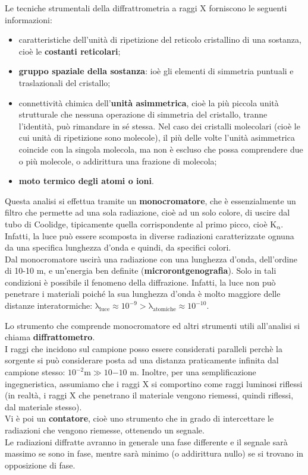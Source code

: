Le tecniche strumentali della diffrattrometria a raggi X forniscono le seguenti informazioni:
\begin{itemize}
    \item caratteristiche dell'unità di ripetizione del reticolo cristallino di una sostanza, cioè le \textbf{costanti reticolari};
    \item \textbf{gruppo spaziale della sostanza}: ioè gli elementi di simmetria puntuali e traslazionali del cristallo;
    \item connettività chimica dell'\textbf{unità asimmetrica}, cioè la più piccola unità strutturale che nessuna operazione di simmetria del cristallo, tranne l'identità, può rimandare in sé stessa. Nel caso dei cristalli molecolari (cioè le cui unità di ripetizione sono molecole), il più delle volte l'unità asimmetrica coincide con la singola molecola, ma non è escluso che possa comprendere due o più molecole, o addirittura una frazione di molecola;
    \item \textbf{moto termico degli atomi o ioni}.
\end{itemize}

Questa analisi si effettua tramite un \textbf{monocromatore}, che è essenzialmente un filtro che permette ad una sola radiazione, cioè ad un solo colore, di uscire dal tubo di Coolidge, tipicamente quella corrispondente al primo picco, cioè $\mathrm{K_{\alpha}}$. Infatti, la luce può essere scomposta in diverse radiazioni caratterizzate ognuna da una specifica lunghezza d’onda e quindi, da specifici colori.\\
Dal monocromatore uscirà una radiazione con una lunghezza d’onda, dell’ordine di 10-10 m, e un’energia ben definite (\textbf{microrontgenografia}). Solo in tali condizioni è possibile il fenomeno della diffrazione. Infatti, la luce non può penetrare i materiali poiché la sua lunghezza d’onda è molto maggiore delle distanze interatormiche: $\mathrm{\lambda_{luce}\approx 10^{-9} > \lambda_{atomiche}\approx 10^{-10}}$.


Lo strumento che comprende monocromatore ed altri strumenti utili all’analisi si chiama \textbf{diffrattometro}.\\
I raggi che incidono sul campione posso essere considerati paralleli perchè la sorgente si può considerare posta ad una distanza praticamente infinita dal campione stesso: $10^{-2} \mathrm{m} \gg 10{-10}$ m. Inoltre, per una semplificazione ingegneristica, assumiamo che i raggi X si comportino come raggi luminosi riflessi (in realtà, i raggi X che penetrano il materiale vengono riemessi, quindi riflessi, dal materiale stesso).\\
Vi è poi un \textbf{contatore}, cioè uno strumento che in grado di intercettare le radiazioni che vengono riemesse, ottenendo un segnale.\\
Le radiazioni diffratte avranno in generale una fase differente e il segnale sarà massimo se sono in fase, mentre sarà minimo (o addirittura nullo) se si trovano in opposizione di fase.


